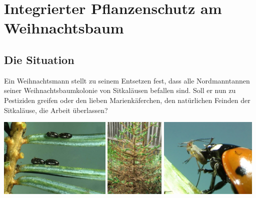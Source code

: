 \documentclass[%
<<<<<<< Updated upstream
11pt,%
twoside,%
titlepage,%
german,%
headsepline%
]{scrartcl}
\begin{document}
\clearpage




\clearpage

\section{Integrierter Pflanzenschutz am Weihnachtsbaum}
\subsection{Die Situation}
Ein Weihnachtsmann stellt zu seinem Entsetzen fest, dass alle Nordmanntannen seiner Weihnachtsbaumkolonie von Sitkaläusen befallen sind. Soll er nun zu Pestiziden greifen oder den lieben Marienkäferchen, den natürlichen Feinden der Sitkaläuse, die Arbeit überlassen?
\\[2ex]

\begin{center}
\includegraphics[height=3.8cm]{pictures/sitkalauseier.jpg}
\includegraphics[height=3.8cm]{pictures/tannenbaum.jpg}
\includegraphics[height=3.8cm]{pictures/marienkaefer.jpg}
\end{center}
\end{document}
